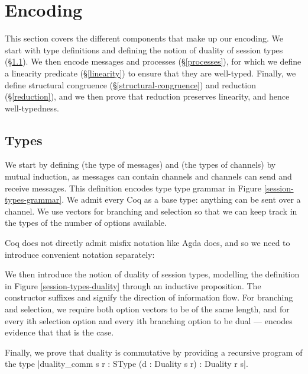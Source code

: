 \documentclass{mproj}
\begin{document}
\section{Encoding}\label{encoding}

This section covers the different components that make up our encoding. We start with type definitions and defining the notion of duality of session types (\S \ref{types}). We then encode messages and processes (\S \ref{processes}), for which we define a linearity predicate (\S \ref{linearity}) to ensure that they are well-typed. Finally, we define structural congruence (\S \ref{structural-congruence}) and reduction (\S \ref{reduction}), and we then prove that reduction preserves linearity, and hence well-typedness.

\subsection{Types}\label{types}

We start by defining  (the type of messages) and  (the types of channels) by mutual induction, as messages can contain channels and channels can send and receive messages. This definition encodes type type grammar in Figure \ref{session-types-grammar}. We admit every Coq  as a base type: anything can be sent over a channel. We use vectors for branching and selection so that we can keep track in the types of the number of options available.


Coq does not directly admit misfix notation like Agda does, and so we need to introduce convenient notation separately:


We then introduce the notion of duality of session types, modelling the definition in Figure \ref{session-types-duality} through an inductive proposition. The constructor suffixes  and  signify the direction of information flow. For branching and selection, we require both option vectors to be of the same length, and for every ith selection option and every ith branching option to be dual ---  encodes evidence that that is the case. 


Finally, we prove that duality is commutative by providing a recursive program of the type \coqe|duality_comm {s r : SType} (d : Duality s r) : Duality r s|.
\end{document}
